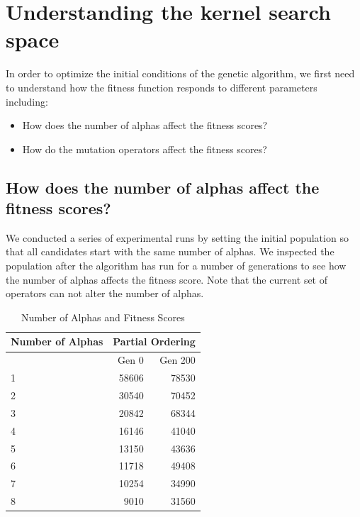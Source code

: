 \documentclass[preprint,12pt,3p]{elsarticle}
\begin{document}
\section{Understanding the kernel search space}
In order to optimize the initial conditions of the genetic algorithm, we first need to understand how the fitness function responds to different parameters including:

\begin{itemize}
\item How does the number of alphas affect the fitness scores?
\item How do the mutation operators affect the fitness scores?
\end{itemize}

\subsection{How does the number of alphas affect the fitness scores?}
We conducted a series of experimental runs by setting the initial population so that all candidates start with the same number of alphas. We inspected the population after the algorithm has run for a number of generations to see how the number of alphas affects the fitness score. Note that the current set of operators can not alter the number of alphas.

\begin{table}[h]
\caption{Number of Alphas and Fitness Scores}
\label{NumberOfAlphas}
\centering
\begin{tabular}{|l|r|r|}
\hline
Number of Alphas & \multicolumn{2}{c|}{Partial Ordering} \\ \hline
                 & Gen 0            & Gen 200            \\ \hline
{ 1 } & { 58606 } & { 78530 } \\ \hline
{ 2 } & { 30540 } & { 70452 } \\ \hline
{ 3 } & { 20842 } & { 68344 } \\ \hline
{ 4 } & { 16146 } & { 41040 } \\ \hline
{ 5 } & { 13150 } & { 43636 } \\ \hline
{ 6 } & { 11718 } & { 49408 } \\ \hline
{ 7 } & { 10254 } & { 34990 } \\ \hline
{ 8 } & {  9010 } & { 31560 } \\ \hline
\end{tabular}
\end{table}
\end{document}
